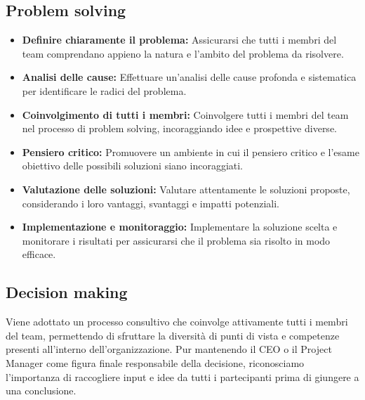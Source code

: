 \documentclass[oneside]{book}
\begin{document}
\subsection{Problem solving}
\begin{itemize}
    \item \textbf{Definire chiaramente il problema:}
        Assicurarsi che tutti i membri del team comprendano appieno la natura e l'ambito del problema da risolvere.
\item \textbf{Analisi delle cause:} Effettuare un'analisi delle cause profonda e sistematica per identificare le radici del problema.
\item \textbf{Coinvolgimento di tutti i membri:} Coinvolgere tutti i membri del team nel processo di problem solving, incoraggiando idee e prospettive diverse.
\item \textbf{Pensiero critico:} Promuovere un ambiente in cui il pensiero critico e l'esame obiettivo delle possibili soluzioni siano incoraggiati.
\item \textbf{Valutazione delle soluzioni:} Valutare attentamente le soluzioni proposte, considerando i loro vantaggi, svantaggi e impatti potenziali.
\item \textbf{Implementazione e monitoraggio:} Implementare la soluzione scelta e monitorare i risultati per assicurarsi che il problema sia risolto in modo efficace.
\end{itemize}

\subsection{Decision making}
Viene adottato un processo consultivo che coinvolge attivamente tutti i membri del team, permettendo di sfruttare la diversità di punti di vista e competenze presenti all'interno dell'organizzazione. Pur mantenendo il CEO o il Project Manager come figura finale responsabile della decisione, riconosciamo l'importanza di raccogliere input e idee da tutti i partecipanti prima di giungere a una conclusione.
\end{document}

